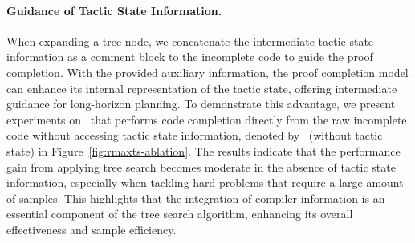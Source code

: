 \paragraph{Guidance of Tactic State Information.}
When expanding a tree node, we concatenate the intermediate tactic state information as a comment block to the incomplete code to guide the proof completion.
With the provided auxiliary information, the proof completion model can enhance its internal representation of the tactic state, offering intermediate guidance for long-horizon planning.
To demonstrate this advantage, we present experiments on \treesearch~that performs code completion directly from the raw incomplete code without accessing tactic state information, denoted by \treesearch~(without tactic state) in Figure~\ref{fig:rmaxts-ablation}.
The results indicate that the performance gain from applying tree search becomes moderate in the absence of tactic state information, especially when tackling hard problems that require a large amount of samples.
This highlights that the integration of compiler information is an essential component of the tree search algorithm, enhancing its overall effectiveness and sample efficiency.
